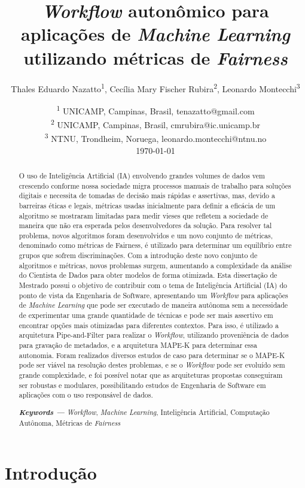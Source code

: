 \documentclass{article}
\title{\textit{Workflow} autonômico para aplicações de \textit{Machine Learning} utilizando métricas de \textit{Fairness}}
\author{Thales Eduardo Nazatto\textsuperscript{1}, Cecília Mary Fischer Rubira\textsuperscript{2}, Leonardo Montecchi\textsuperscript{3}}
\date{
	\textsuperscript{1} UNICAMP, Campinas, Brasil, tenazatto@gmail.com
	\\
	\textsuperscript{2} UNICAMP, Campinas, Brasil, cmrubira@ic.unicamp.br
	\\
	\textsuperscript{3} NTNU, Trondheim, Noruega, leonardo.montecchi@ntnu.no\\[2ex]
	\today
}
\providecommand{\keywords}[1]
{
  \small	
  \textbf{\textit{Keywords ---}} #1
}
\begin{document}
\maketitle

\begin{abstract}
O uso de Inteligência Artificial (IA) envolvendo grandes volumes de dados vem crescendo conforme nossa sociedade migra processos manuais de trabalho para soluções digitais e necessita de tomadas de decisão mais rápidas e assertivas, mas, devido a barreiras éticas e legais, métricas usadas inicialmente para definir a eficácia de um algoritmo se mostraram limitadas para medir vieses que refletem a sociedade de maneira que não era esperada pelos desenvolvedores da solução. Para resolver tal problema, novos algoritmos foram desenvolvidos e um novo conjunto de métricas, denominado como métricas de Fairness, é utilizado para determinar um equilíbrio entre grupos que sofrem discriminações. Com a introdução deste novo conjunto de algoritmos e métricas, novos problemas surgem, aumentando a complexidade da análise do Cientista de Dados para obter modelos de forma otimizada. Esta dissertação de Mestrado possui o objetivo de contribuir com o tema de Inteligência Artificial (IA) do ponto de vista da Engenharia de Software, apresentando um \textit{Workflow} para aplicações de \textit{Machine Learning} que pode ser executado de maneira autônoma sem a necessidade de experimentar uma grande quantidade de técnicas e pode ser mais assertivo em encontrar opções mais otimizadas para diferentes contextos. Para isso, é utilizado a arquitetura Pipe-and-Filter para realizar o \textit{Workflow}, utilizando proveniência de dados para gravação de metadados, e a arquitetura MAPE-K para determinar essa autonomia. Foram realizados diversos estudos de caso para determinar se o MAPE-K pode ser viável na resolução destes problemas, e se o \textit{Workflow} pode ser evoluído sem grande complexidade, e foi possível notar que as arquiteturas propostas conseguiram ser robustas e modulares, possibilitando estudos de Engenharia de Software em aplicações com o uso responsável de dados.

\keywords{\textit{Workflow}, \textit{Machine Learning}, Inteligência Artificial, Computação Autônoma, Métricas de \textit{Fairness}}
\end{abstract}

\section{Introdução}
\end{document}
